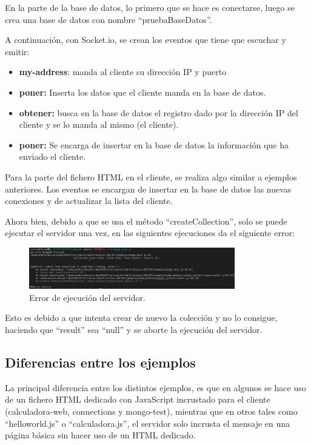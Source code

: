 \documentclass{article}
\begin{document}
En la parte de la base de datos, lo primero que se hace es conectarse, luego se crea una base de datos con nombre ``pruebaBaseDatos''.

\bigskip

A continuación, con Socket.io, se crean los eventos que tiene que escuchar y emitir: 

\begin{itemize}
    \item \textbf{my-address}: manda al cliente su dirección IP y puerto
    \item \textbf{poner:} Inserta los datos que el cliente manda en la base de datos.
    \item \textbf{obtener:} busca en la base de datos el registro dado por la dirección IP del cliente y se lo manda al mismo (el cliente).
    \item \textbf{poner:} Se encarga de insertar en la base de datos la información que ha enviado el cliente.
\end{itemize}

Para la parte del fichero HTML en el cliente, se realiza algo similar a ejemplos anteriores. Los eventos se encargan de insertar en la base de datos las nuevas conexiones y de actualizar la lista del cliente.

\newpage

Ahora bien, debido a que se usa el método ``createCollection'', solo se puede ejecutar el servidor una vez, en las siguientes ejecuciones da el siguiente error:

\begin{figure}[H]
    \centering
    \includegraphics[width=0.8\textwidth]{images/errormongo.png}
    \caption{Error de ejecución del servidor.}
\end{figure}

Esto es debido a que intenta crear de nuevo la colección y no lo consigue, haciendo que ``result'' sea ``null'' y se aborte la ejecución del servidor.

\subsection{Diferencias entre los ejemplos}
La principal diferencia entre los distintos ejemplos, es que en algunos se hace uso de un fichero HTML dedicado con JavaScript incrustado para el cliente (calculadora-web, connections y mongo-test), mientras que en otros tales como ``helloworld.js'' o ``calculadora.js'', el servidor solo incrusta el mensaje en una página básica sin hacer uso de un HTML dedicado.
\end{document}
